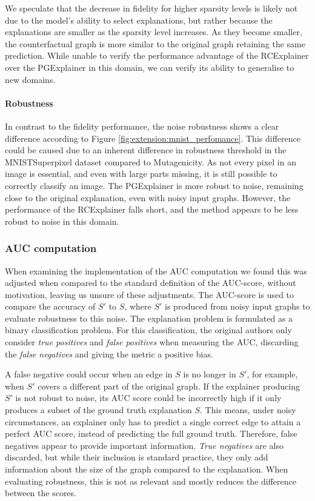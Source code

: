 We speculate that the decrease in fidelity for higher sparsity levels is likely not due to the model's ability to select explanations, but rather because the explanations are smaller as the sparsity level increases. As they become smaller, the counterfactual graph is more similar to the original graph retaining the same prediction. While unable to verify the performance advantage of the RCExplainer over the PGExplainer in this domain, we can verify its ability to generalise to new domains.

\paragraph{Robustness}
In contrast to the fidelity performance, the noise robustness shows a clear difference according to Figure \ref{fig:extension:mnist_perfomance}. This difference could be caused due to an inherent difference in robustness threshold in the MNISTSuperpixel dataset compared to Mutagenicity. As not every pixel in an image is essential, and even with large parts missing, it is still possible to correctly classify an image. The PGExplainer is more robust to noise, remaining close to the original explanation, even with noisy input graphs. However, the performance of the RCExplainer falls short, and the method appears to be less robust to noise in this domain.

\subsubsection{AUC computation} \label{subsec:auc}
When examining the implementation of the AUC computation we found this was adjusted when compared to the standard definition of the AUC-score, without motivation, leaving us unsure of these adjustments. The AUC-score is used to compare the accuracy of $S'$ to $S$, where $S'$ is produced from noisy input graphs to evaluate robustness to this noise. The explanation problem is formulated as a binary classification problem. For this classification, the original authors only consider \textit{true positives} and \textit{false positives} when measuring the AUC, discarding the \textit{false negatives} and giving the metric a positive bias. 

A false negative could occur when an edge in $S$ is no longer in $S'$, for example, when $S'$ covers a different part of the original graph. If the explainer producing $S'$ is not robust to noise, its AUC score could be incorrectly high if it only produces a subset of the ground truth explanation $S$. This means, under noisy circumstances, an explainer only has to predict a single correct edge to attain a perfect AUC score, instead of predicting the full ground truth. Therefore, false negatives appear to provide important information. \textit{True negatives} are also discarded, but while their inclusion is standard practice, they only add information about the size of the graph compared to the explanation. When evaluating robustness, this is not as relevant and mostly reduces the difference between the scores. 

